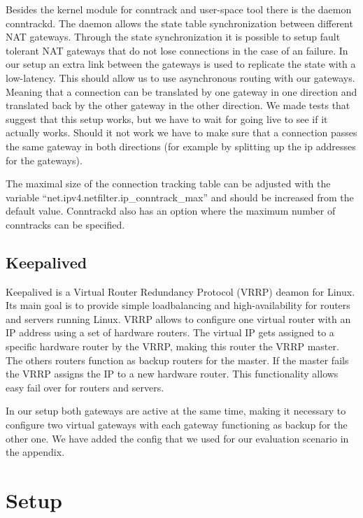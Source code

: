 \documentclass{report}
\begin{document}
Besides the kernel module for conntrack and user-space tool there is the
daemon conntrackd. The daemon allows the state table synchronization
between different NAT gateways. Through the state synchronization it is
possible to setup fault tolerant NAT gateways that do not lose
connections in the case of an failure. In our setup an extra link
between the gateways is used to replicate the state with a low-latency.
This should allow us to use asynchronous routing with our gateways.
Meaning that a connection can be translated by one gateway in one
direction and translated back by the other gateway in the other
direction. We made tests that suggest that this setup works, but we have
to wait for going live to see if it actually works. Should it not work
we have to make sure that a connection passes the same gateway in both
directions (for example by splitting up the ip addresses for the
gateways).

The maximal size of the connection tracking table can be adjusted with
the variable ``net.ipv4.netfilter.ip\_conntrack\_max'' and should be
increased from the default value. Conntrackd also has an option where
the maximum number of conntracks can be specified.

\section{Keepalived}\label{keepalived}

Keepalived\cite{keepalived}  is a Virtual Router Redundancy Protocol (VRRP)\cite{vrrp} deamon
for Linux. Its main goal is to provide simple loadbalancing and
high-availability for routers and servers running Linux. VRRP allows to
configure one virtual router with an IP address using a set of hardware
routers. The virtual IP gets assigned to a specific hardware router by
the VRRP, making this router the VRRP master. The others routers
function as backup routers for the master. If the master fails the VRRP
assigns the IP to a new hardware router. This functionality allows easy
fail over for routers and servers.

In our setup both gateways are active at the same time, making it
necessary to configure two virtual gateways with each gateway
functioning as backup for the other one. We have added the config that
we used for our evaluation scenario in the appendix.


\chapter{Setup}\label{setup}
\end{document}
